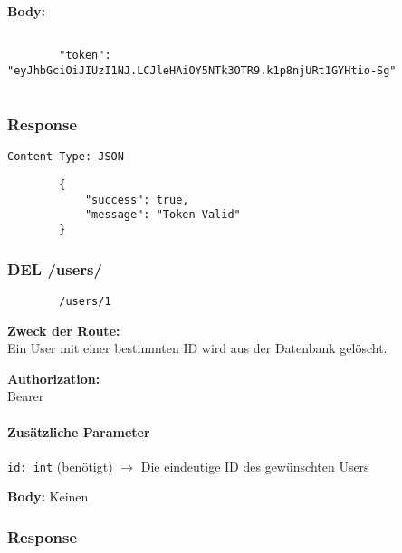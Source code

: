 \textbf{Body:}
\begin{code}
    \begin{lstlisting}

        "token": "eyJhbGciOiJIUzI1NJ.LCJleHAiOY5NTk3OTR9.k1p8njURt1GYHtio-Sg"
        
    \end{lstlisting}
    \caption{Body der Validate Route}
\end{code}


\subsubsection{Response}

\begin{code}
    \lstinline{Content-Type: JSON}
    \begin{lstlisting}
        {
            "success": true,
            "message": "Token Valid"
        }
    \end{lstlisting}
    \caption{Response für die Validate Token Route}
\end{code}

\pagebreak

\subsubsection{DEL /users/}

\begin{code}
    \begin{lstlisting}
        /users/1
    \end{lstlisting}
    \caption{Body der aktuellen Route}
\end{code}

\textbf{Zweck der Route:} \\
Ein User mit einer bestimmten ID wird aus der Datenbank gelöscht.

\textbf{Authorization:} \\
Bearer

\paragraph{Zusätzliche Parameter}
\lstinline{id: int} (benötigt)
$\rightarrow$ Die eindeutige ID des gewünschten Users

\textbf{Body:}
Keinen


\subsubsection{Response}

